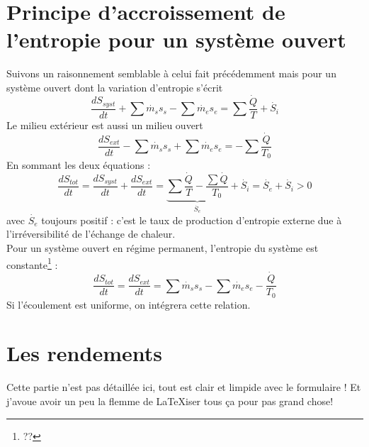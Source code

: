 	\section{Principe d’accroissement de l’entropie pour un système ouvert}
	Suivons un raisonnement semblable à celui fait précédemment mais pour un système 
	ouvert dont la variation d'entropie s'écrit
	\begin{equation}
	\dfrac{dS_{syst}}{dt}+\sum \dot{m_s}s_s - \sum \dot{m_e}s_e = \sum\dfrac{\dot{Q}}{T}+\dot{S_i}
	\end{equation}
	Le milieu extérieur est aussi un milieu ouvert 
	\begin{equation}
	\dfrac{dS_{ext}}{dt}-\sum \dot{m_s}s_s + \sum \dot{m_e}s_e = -\sum\dfrac{\dot{Q}}{T_0}
	\end{equation}
	En sommant les deux équations :
	\begin{equation}
	\dfrac{dS_{tot}}{dt} = \dfrac{dS_{syst}}{dt}+\dfrac{dS_{ext}}{dt} = \underbrace{
	\sum\dfrac{\dot{Q}}{T}-\dfrac{\sum \dot{Q}}{T_0}}_{\dot{S_e}} + \dot{S_i} = \dot{S_e}
	+\dot{S_i} > 0
	\end{equation}
	avec $\dot{S_e}$ toujours positif : c'est le taux de production d'entropie externe due 
	à l'irréversibilité de l'échange de chaleur.\\
	Pour un système ouvert en régime permanent, l’entropie du système est constante\footnote{??} :
	\begin{equation}
	\dfrac{dS_{tot}}{dt} = \dfrac{dS_{ext}}{dt} = \sum\dot{m_s}s_s-\sum\dot{m_e}s_e - 
	\dfrac{\dot{Q}}{T_0}
	\end{equation}
	Si l'écoulement est uniforme, on intégrera cette relation.
	
	\section{Les rendements}
	Cette partie n'est pas détaillée ici, tout est clair et limpide avec le formulaire ! Et 
	j'avoue avoir un peu la flemme de \LaTeX iser tous ça pour pas grand chose!
	
	
	